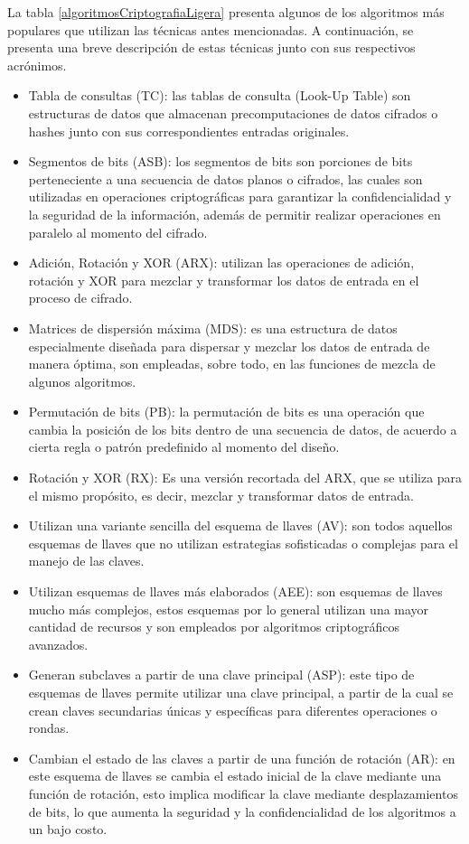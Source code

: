 \documentclass[a4paper,10pt]{article}
\begin{document}
	La tabla \ref{algoritmosCriptografiaLigera} presenta algunos de los algoritmos más populares que utilizan las técnicas antes mencionadas. A continuación, se presenta una breve descripción de estas técnicas junto con sus respectivos acrónimos.
	\begin{itemize}
		\item Tabla de consultas (TC): las tablas de consulta (Look-Up Table) son estructuras de datos que almacenan precomputaciones de datos cifrados o hashes junto con sus correspondientes entradas originales.
		\item Segmentos de bits (ASB): los segmentos de bits son porciones de bits perteneciente a una secuencia de datos planos o cifrados, las cuales son utilizadas en operaciones criptográficas para garantizar la confidencialidad y la seguridad de la información, además de permitir realizar operaciones en paralelo al momento del cifrado.
		\item Adición, Rotación y XOR (ARX): utilizan las operaciones de adición, rotación y XOR para mezclar y transformar los datos de entrada en el proceso de cifrado.
		\item Matrices de dispersión máxima (MDS): es una estructura de datos especialmente diseñada para dispersar y mezclar los datos de entrada de manera óptima, son empleadas, sobre todo, en las funciones de mezcla de algunos algoritmos.
		\item Permutación de bits (PB): la permutación de bits es una operación que cambia la posición de los bits dentro de una secuencia de datos, de acuerdo a cierta regla o patrón predefinido al momento del diseño.
		\item Rotación y XOR (RX): Es una versión recortada del ARX, que se utiliza para el mismo propósito, es decir, mezclar y transformar datos de entrada.
		\item Utilizan una variante sencilla del esquema de llaves (AV): son todos aquellos esquemas de llaves que no utilizan estrategias sofisticadas o complejas para el manejo de las claves.
		\item Utilizan esquemas de llaves más elaborados (AEE): son esquemas de llaves mucho más complejos, estos esquemas por lo general utilizan una mayor cantidad de recursos y son empleados por algoritmos criptográficos avanzados.
		\item Generan subclaves a partir de una clave principal (ASP): este tipo de esquemas de llaves permite utilizar una clave principal, a partir de la cual se crean claves secundarias únicas y específicas para diferentes operaciones o rondas.
		\item Cambian el estado de las claves a partir de una función de rotación (AR): en este esquema de llaves se cambia el estado inicial de la clave mediante una función de rotación, esto implica modificar la clave mediante desplazamientos de bits, lo que aumenta la seguridad y la confidencialidad de los algoritmos a un bajo costo.
	\end{itemize}
\end{document}
